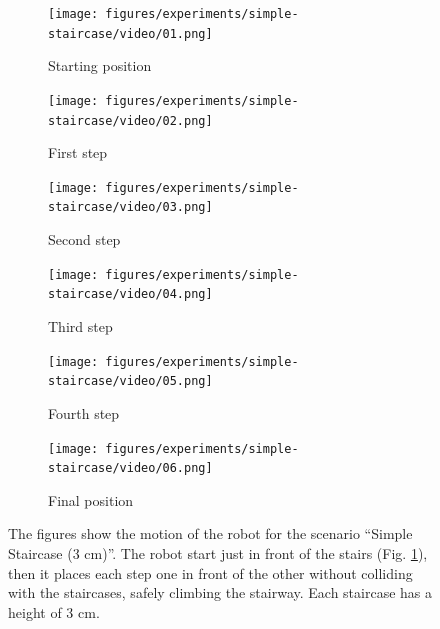 \begin{figure}
  \begin{subfigure}{0.48\textwidth}
    \texttt{[image: figures/experiments/simple-staircase/video/01.png]}
    \caption{Starting position}
    \label{fig:exp:simple-staircase:frame1}
  \end{subfigure}\hspace*{\fill}
  \begin{subfigure}{0.48\textwidth}
    \texttt{[image: figures/experiments/simple-staircase/video/02.png]}
    \caption{First step}
  \end{subfigure}
  \begin{subfigure}{0.48\textwidth}
    \texttt{[image: figures/experiments/simple-staircase/video/03.png]}
    \caption{Second step}
  \end{subfigure}\hspace*{\fill}
  \begin{subfigure}{0.48\textwidth}
    \texttt{[image: figures/experiments/simple-staircase/video/04.png]}
    \caption{Third step}
  \end{subfigure}
  \begin{subfigure}{0.48\textwidth}
    \texttt{[image: figures/experiments/simple-staircase/video/05.png]}
    \caption{Fourth step}
  \end{subfigure}\hspace*{\fill}
  \begin{subfigure}{0.48\textwidth}
    \texttt{[image: figures/experiments/simple-staircase/video/06.png]}
    \caption{Final position}
  \end{subfigure} \caption{The figures show the motion of the robot for the 
      scenario ``Simple Staircase (3 cm)''. The robot start just in front of the 
      stairs (Fig. \ref{fig:exp:simple-staircase:frame1}), then it places 
      each step one in front of the other without colliding with the staircases,
      safely climbing the stairway. Each staircase has a height of 3 cm.}
  \label{fig:experiments:simple-staircase:videoframes}
\end{figure}
